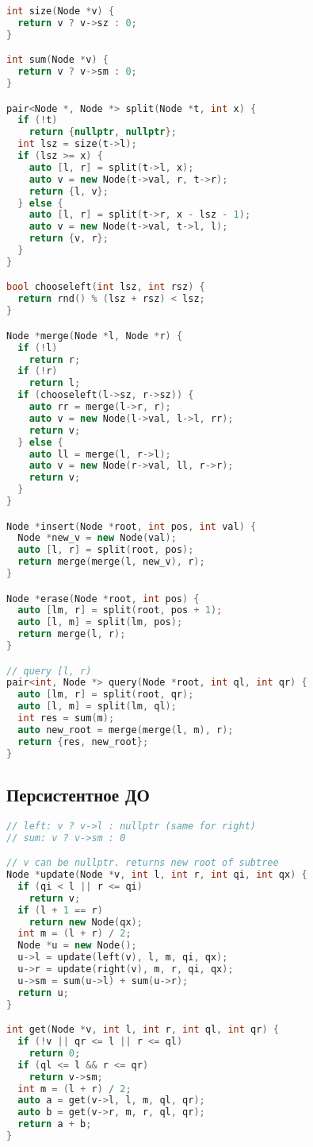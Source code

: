 \documentclass[10pt,a4paper,landscape,twosided]{extarticle}
\begin{document}
\begin{multicols*}{3}
\begin{lstlisting}[language=C++]
int size(Node *v) {
  return v ? v->sz : 0;
}

int sum(Node *v) {
  return v ? v->sm : 0;
}

pair<Node *, Node *> split(Node *t, int x) {
  if (!t)
    return {nullptr, nullptr};
  int lsz = size(t->l);
  if (lsz >= x) {
    auto [l, r] = split(t->l, x);
    auto v = new Node(t->val, r, t->r);
    return {l, v};
  } else {
    auto [l, r] = split(t->r, x - lsz - 1);
    auto v = new Node(t->val, t->l, l);
    return {v, r};
  }
}

bool chooseleft(int lsz, int rsz) {
  return rnd() % (lsz + rsz) < lsz;
}

Node *merge(Node *l, Node *r) {
  if (!l)
    return r;
  if (!r)
    return l;
  if (chooseleft(l->sz, r->sz)) {
    auto rr = merge(l->r, r);
    auto v = new Node(l->val, l->l, rr);
    return v;
  } else {
    auto ll = merge(l, r->l);
    auto v = new Node(r->val, ll, r->r);
    return v;
  }
}

Node *insert(Node *root, int pos, int val) {
  Node *new_v = new Node(val);
  auto [l, r] = split(root, pos);
  return merge(merge(l, new_v), r);
}

Node *erase(Node *root, int pos) {
  auto [lm, r] = split(root, pos + 1);
  auto [l, m] = split(lm, pos);
  return merge(l, r);
}

// query [l, r)
pair<int, Node *> query(Node *root, int ql, int qr) {
  auto [lm, r] = split(root, qr);
  auto [l, m] = split(lm, ql);
  int res = sum(m);
  auto new_root = merge(merge(l, m), r);
  return {res, new_root};
}

\end{lstlisting}

\subsection{Персистентное ДО}
\begin{lstlisting}[language=C++]
// left: v ? v->l : nullptr (same for right)
// sum: v ? v->sm : 0

// v can be nullptr. returns new root of subtree
Node *update(Node *v, int l, int r, int qi, int qx) {
  if (qi < l || r <= qi)
    return v;
  if (l + 1 == r)
    return new Node(qx);
  int m = (l + r) / 2;
  Node *u = new Node();
  u->l = update(left(v), l, m, qi, qx);
  u->r = update(right(v), m, r, qi, qx);
  u->sm = sum(u->l) + sum(u->r);
  return u;
}

int get(Node *v, int l, int r, int ql, int qr) {
  if (!v || qr <= l || r <= ql)
    return 0;
  if (ql <= l && r <= qr)
    return v->sm;
  int m = (l + r) / 2;
  auto a = get(v->l, l, m, ql, qr);
  auto b = get(v->r, m, r, ql, qr);
  return a + b;
}


\end{lstlisting}
\end{multicols*}
\end{document}

